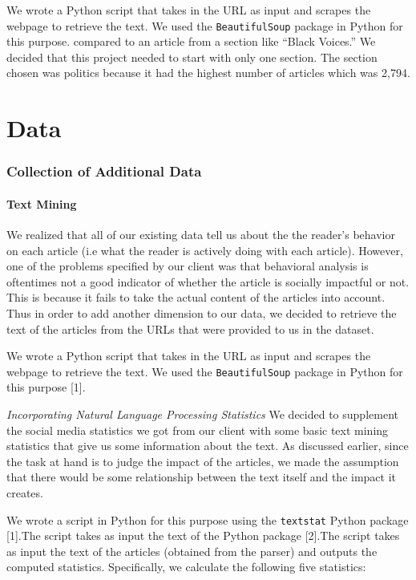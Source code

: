 \documentclass[10pt,letterpaper]{article}
\begin{document}
We wrote a Python script that takes in the URL as input and scrapes the
webpage to retrieve the text. We used the \texttt{BeautifulSoup} package
in Python for this purpose.
compared to an article from a section like ``Black Voices.'' We decided
that this project needed to start with only one section. The section
chosen was politics because it had the highest number of articles which
was 2,794.

\hypertarget{data}{%
\section{Data}\label{data}}

\hypertarget{collection-of-additional-data}{%
\subsubsection{Collection of Additional
Data}\label{collection-of-additional-data}}

\hypertarget{text-mining}{%
\paragraph{Text Mining}\label{text-mining}}

We realized that all of our existing data tell us about the the reader's
behavior on each article (i.e what the reader is actively doing with
each article). However, one of the problems specified by our client was
that behavioral analysis is oftentimes not a good indicator of whether
the article is socially impactful or not. This is because it fails to
take the actual content of the articles into account. Thus in order to
add another dimension to our data, we decided to retrieve the text of
the articles from the URLs that were provided to us in the dataset.

We wrote a Python script that takes in the URL as input and scrapes the
webpage to retrieve the text. We used the \texttt{BeautifulSoup} package
in Python for this purpose {[}1{]}.

\emph{Incorporating Natural Language Processing Statistics} We decided
to supplement the social media statistics we got from our client with
some basic text mining statistics that give us some information about
the text. As discussed earlier, since the task at hand is to judge the
impact of the articles, we made the assumption that there would be some
relationship between the text itself and the impact it creates.

We wrote a script in Python for this purpose using the \texttt{textstat}
Python package {[}1{]}.The script takes as input the text of the
Python package {[}2{]}.The script takes as input the text of the
articles (obtained from the parser) and outputs the computed statistics.
Specifically, we calculate the following five statistics:
\end{document}
